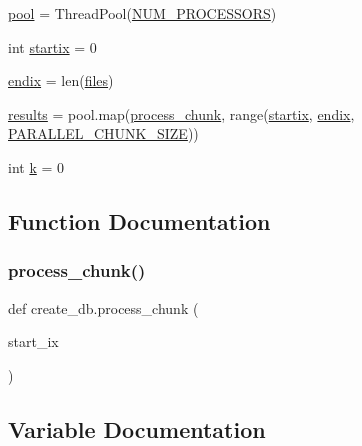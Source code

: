 \begin{DoxyCompactItemize}
\item 
\hyperlink{namespacecreate__db_a08369a5d92b58607a6d7b5f2c5412e7e}{pool} = Thread\+Pool(\hyperlink{namespacecreate__db_a2da1873dcc0f1772f769b24a8afb0cc9}{N\+U\+M\+\_\+\+P\+R\+O\+C\+E\+S\+S\+O\+RS})
\item 
int \hyperlink{namespacecreate__db_aa299b331ef2c005b58a6f17618a9ea8e}{startix} = 0
\item 
\hyperlink{namespacecreate__db_a293646c9cd089d3131426e96b401b18e}{endix} = len(\hyperlink{namespacecreate__db_ae907838b4f6feec6455ce38eba8a26fe}{files})
\item 
\hyperlink{namespacecreate__db_a7926ceddf2e86e190ed055e87168b4d5}{results} = pool.\+map(\hyperlink{namespacecreate__db_a0db532a727d6ffe9852f154e5d148a06}{process\+\_\+chunk}, range(\hyperlink{namespacecreate__db_aa299b331ef2c005b58a6f17618a9ea8e}{startix}, \hyperlink{namespacecreate__db_a293646c9cd089d3131426e96b401b18e}{endix}, \hyperlink{namespacecreate__db_af0cf695fe45d12d416c1722b2fd80b0c}{P\+A\+R\+A\+L\+L\+E\+L\+\_\+\+C\+H\+U\+N\+K\+\_\+\+S\+I\+ZE}))
\item 
int \hyperlink{namespacecreate__db_af3731854a38e468a950476abf08b486e}{k} = 0
\end{DoxyCompactItemize}


\subsection{Function Documentation}
\mbox{\label{namespacecreate__db_a0db532a727d6ffe9852f154e5d148a06}} 
\subsubsection{\texorpdfstring{process\+\_\+chunk()}{process\_chunk()}}
{\footnotesize\ttfamily def create\+\_\+db.\+process\+\_\+chunk (\begin{DoxyParamCaption}\item[{}]{start\+\_\+ix }\end{DoxyParamCaption})}



\subsection{Variable Documentation}
\mbox{\label{namespacecreate__db_af3656325d8df791e2e0e62165f52e0d0}} 
